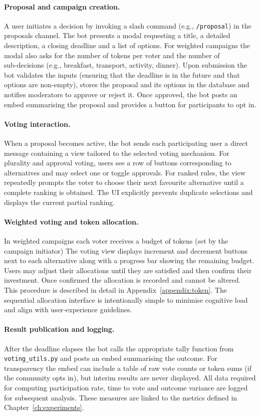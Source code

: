 \paragraph{Proposal and campaign creation.}  A user initiates a decision
by invoking a slash command (e.g., \texttt{/proposal}) in the proposals
channel.  The bot presents a modal requesting a title, a detailed
description, a closing deadline and a list of options.  For weighted
campaigns the modal also asks for the number of tokens per voter and the
number of sub‑decisions (e.g., breakfast, transport, activity, dinner).
Upon submission the bot validates the inputs (ensuring that the deadline
is in the future and that options are non‑empty), stores the proposal
and its options in the database and notifies moderators to approve or
reject it.  Once approved, the bot posts an embed summarising the
proposal and provides a button for participants to opt in.

\paragraph{Voting interaction.}  When a proposal becomes active, the bot
sends each participating user a direct message containing a view tailored
to the selected voting mechanism.  For plurality and approval voting,
users see a row of buttons corresponding to alternatives and may select
one or toggle approvals.  For ranked rules, the view repeatedly
prompts the voter to choose their next favourite alternative until a
complete ranking is obtained.  The UI explicitly prevents
duplicate selections and displays the current partial ranking.

\paragraph{Weighted voting and token allocation.}  In weighted
campaigns each voter receives a budget of tokens (set by the campaign initiator)  The voting view displays increment and decrement
buttons next to each alternative along with a progress bar showing the
remaining budget.  Users may adjust their allocations until they are
satisfied and then confirm their investment.  Once confirmed the
allocation is recorded and cannot be altered.  This procedure is
described in detail in Appendix~\ref{appendix:token}.  The sequential
allocation interface is intentionally simple to minimise cognitive load
and align with user‑experience guidelines.

\paragraph{Result publication and logging.}  After the deadline
elapses the bot calls the appropriate tally function from
\texttt{voting\_utils.py} and posts an embed summarising the outcome.
For transparency the embed can include a table of raw vote counts or
token sums (if the community opts in), but interim results are never
displayed.  All data required for computing participation rate, time to
vote and outcome variance are logged for subsequent analysis.  These
measures are linked to the metrics defined in Chapter~\ref{ch:experiments}.